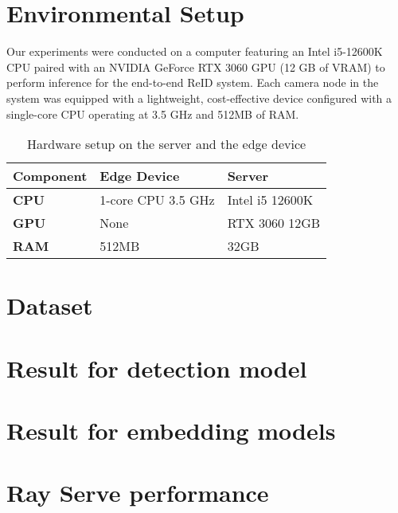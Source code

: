 \documentclass[../main.tex]{subfiles}
\begin{document}
\section{Environmental Setup}
\label{sec:environmental_setup}

Our experiments were conducted on a computer featuring an Intel i5-12600K CPU paired with an NVIDIA GeForce RTX 3060 GPU (12 GB of VRAM) to perform inference for the end-to-end ReID system. Each camera node in the system was equipped with a lightweight, cost-effective device configured with a single-core CPU operating at 3.5 GHz and 512MB of RAM.

\begin{table}[h]
\centering
\caption{Hardware setup on the server and the edge device}
\label{tab:hardware_setup}
\begin{tabular}{|p{3.5cm}|p{5cm}|p{5cm}|}
\hline
\textbf{Component} & \textbf{Edge Device} & \textbf{Server} \\
\hline
\textbf{CPU} & 1-core CPU 3.5 GHz & Intel i5 12600K \\
\hline
\textbf{GPU} & None & RTX 3060 12GB \\
\hline
\textbf{RAM} & 512MB & 32GB \\
\hline
\end{tabular}
\end{table}

\section{Dataset}
\label{sec:dataset}


\section{Result for detection model}
\label{sec:detection_experiments}


\section{Result for embedding models}
\label{sec:embedding_experiments}


% 

\section{Ray Serve performance}
\label{sec:ray_serve_performance}

\end{document}
